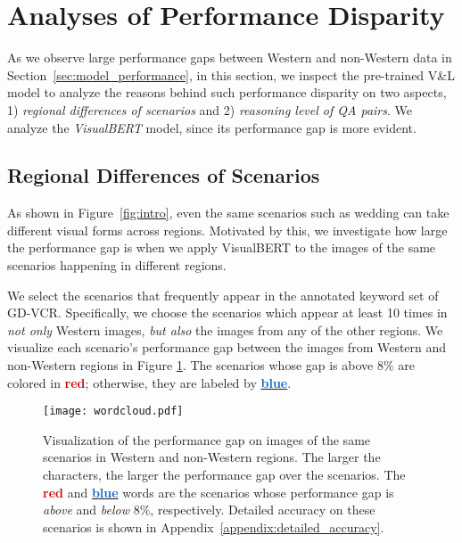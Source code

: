 \documentclass[11pt]{article}
\begin{document}
\section{Analyses of Performance Disparity}
As we observe large performance gaps between Western and non-Western data in Section~\ref{sec:model_performance}, in this section, we inspect the pre-trained V\&L model to analyze the reasons behind such performance disparity on two aspects, 1) \emph{regional differences of scenarios} and 2) \emph{reasoning level of QA pairs}. We analyze the \emph{VisualBERT} model, since its performance gap is more evident.

\subsection{Regional Differences of Scenarios}
As shown in Figure~\ref{fig:intro}, even the same scenarios such as wedding can take different visual forms across regions. Motivated by this, we investigate how large the performance gap is when we apply VisualBERT to the images of the same scenarios happening in different regions.

We select the scenarios that frequently appear in the annotated keyword set of GD-VCR. Specifically, we choose the scenarios which appear at least 10 times in \emph{not only} Western images, \emph{but also} the images from any of the other regions. We visualize each scenario's performance gap between the images from Western and non-Western regions in Figure \ref{fig:wordcloud}. The scenarios whose gap is above 8\% are colored in \textbf{\textcolor[HTML]{CC0000}{red}}; otherwise, they are labeled by \underline{\textbf{\textcolor[HTML]{0066CC}{blue}}}. 

\begin{figure}[t]
    \centering
    \texttt{[image: wordcloud.pdf]}
    \caption{Visualization of the performance gap on images of the same scenarios in Western and non-Western regions. The larger the characters, the larger the performance gap over the scenarios. The \textbf{\textcolor[HTML]{CC0000}{red}} and \underline{\textbf{\textcolor[HTML]{0066CC}{blue}}} words are the scenarios whose performance gap is \emph{above} and \emph{below} 8\%, respectively. Detailed accuracy on these scenarios is shown in Appendix~\ref{appendix:detailed_accuracy}.}
    \label{fig:wordcloud}
\end{figure}
\end{document}

